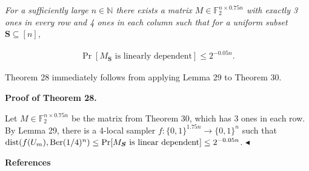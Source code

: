 \documentclass[10pt,a4paper]{article}
\begin{document}
\emph{For a sufficiently large $n\in\mathbb{N}$ there exists a matrix $M\in\mathbb{F}_{2}^{n\times 0.75n}$ with exactly 3 ones in every row and 4 ones in each column such that for a uniform subset $\boldsymbol{S}\subseteq[n]$,}\par


\[\begin{gathered}
\Pr[\text{$M_{\boldsymbol{S}}$ is linearly dependent}]\leq 2^{-0.05n}.
\end{gathered}\]






Theorem 28 immediately follows from applying Lemma 29 to Theorem 30.\par





\par\medskip\noindent\textbf{Proof of Theorem 28.}\par




Let $M\in\mathbb{F}_{2}^{n\times 0.75n}$ be the matrix from Theorem 30, which has 3 ones in each row.
By Lemma 29, there is a 4-local sampler $f\colon\{0,1\}^{1.75n}\to\{0,1\}^{n}$ such that $\mathrm{dist}(f(U_{m}),\textnormal{Ber}(1/4)^{n})\leq\Pr[\text{$M_{\boldsymbol{S}}$ is linear dependent}]\leq 2^{-0.05n}$.
$\blacktriangleleft$\par






\par\medskip\noindent\textbf{References}\par
\end{document}
